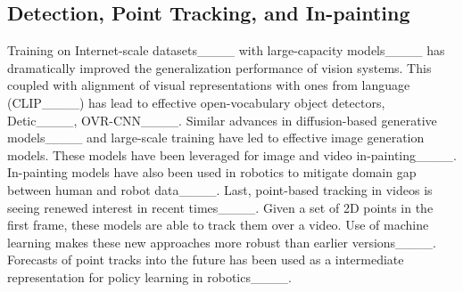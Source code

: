 \subsection{Detection, Point Tracking, and In-painting}
Training on Internet-scale datasets____ with large-capacity models____ has dramatically improved the generalization performance of
vision systems. This coupled with alignment of visual representations with ones
from language (\eg CLIP____) has lead to
effective open-vocabulary object detectors, \eg Detic____,
OVR-CNN____.
Similar advances in diffusion-based generative
models____ and
large-scale training have led to effective image generation models. These models have been leveraged for image and video
in-painting____. In-painting models have
also been used in robotics to mitigate domain gap between human and
robot data____. 
Last, point-based tracking in videos is seeing renewed interest in recent
times____. Given a set of 2D points in the first frame, these
models are able to track them over a video. Use of machine learning makes
these new approaches more robust than earlier versions____. Forecasts of point tracks into the future has been
used as a intermediate representation for policy learning in
robotics____.